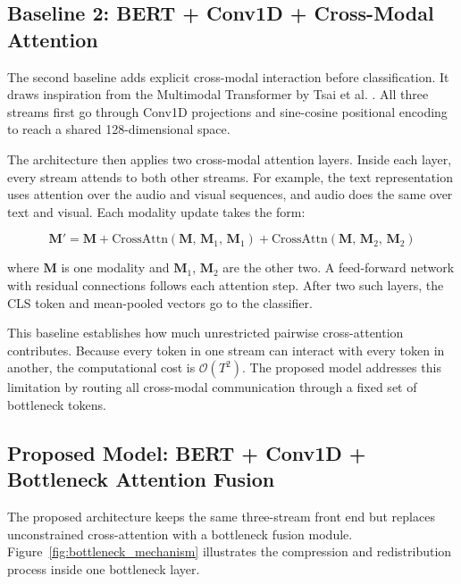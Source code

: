 \subsection{Baseline 2: BERT + Conv1D + Cross-Modal Attention}

\label{subsec:baseline2}

The second baseline adds explicit cross-modal interaction before classification. It draws inspiration from the Multimodal Transformer by Tsai et al. \cite{tsai2019multimodal}. All three streams first go through Conv1D projections and sine-cosine positional encoding to reach a shared 128-dimensional space.

The architecture then applies two cross-modal attention layers. Inside each layer, every stream attends to both other streams. For example, the text representation uses attention over the audio and visual sequences, and audio does the same over text and visual. Each modality update takes the form:

\begin{equation}
\mathbf{M}' = \mathbf{M} + \text{CrossAttn}(\mathbf{M},\, \mathbf{M}_1,\, \mathbf{M}_1) + \text{CrossAttn}(\mathbf{M},\, \mathbf{M}_2,\, \mathbf{M}_2)
\end{equation}

where $\mathbf{M}$ is one modality and $\mathbf{M}_1$, $\mathbf{M}_2$ are the other two. A feed-forward network with residual connections follows each attention step. After two such layers, the CLS token and mean-pooled vectors go to the classifier.

This baseline establishes how much unrestricted pairwise cross-attention contributes. Because every token in one stream can interact with every token in another, the computational cost is $\mathcal{O}(T^2)$. The proposed model addresses this limitation by routing all cross-modal communication through a fixed set of bottleneck tokens.


\subsection{Proposed Model: BERT + Conv1D + Bottleneck Attention Fusion}

\label{subsec:proposed}

The proposed architecture keeps the same three-stream front end but replaces unconstrained cross-attention with a bottleneck fusion module. Figure~\ref{fig:bottleneck_mechanism} illustrates the compression and redistribution process inside one bottleneck layer.

